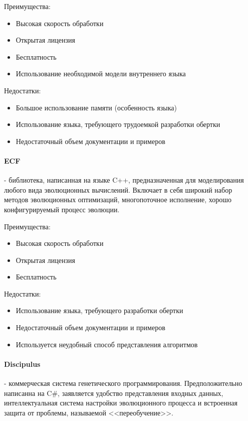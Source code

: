 \documentclass[russian,utf8,emptystyle]{eskdtext}
\begin{document}
\begin{spacing}{1.5}
Преимущества:
\begin{itemize}
\item Высокая скорость обработки
\item Открытая лицензия
\item Бесплатность
\item Использование необходимой модели внутреннего языка
\end{itemize}

Недостатки:
\begin{itemize}
\item Большое использование памяти (особенность языка)
\item Использование языка, требующего трудоемкой разработки обертки 
\item Недостаточный объем документации и примеров
\end{itemize}

\paragraph{ECF} - библиотека, написанная на языке C++, предназначенная для моделирования любого вида эволюционных вычислений. Включает в себя широкий набор методов эволюционных оптимизаций, многопоточное исполнение, хорошо конфигурируемый процесс эволюции.

Преимущества:
\begin{itemize}
\item Высокая скорость обработки
\item Открытая лицензия
\item Бесплатность
\end{itemize}

Недостатки:
\begin{itemize}
\item Использование языка, требующего разработки обертки 
\item Недостаточный объем документации и примеров
\item Используется неудобный способ представления алгоритмов
\end{itemize}

\paragraph{Discipulus} - коммерческая система генетического программирования. Предположительно написанна на C\#, заявляется удобство представления входных данных, интеллектуальная система настройки эволюционного процесса и встроенная защита от проблемы, называемой <<переобучение>>.


\end{spacing}
\end{document}
